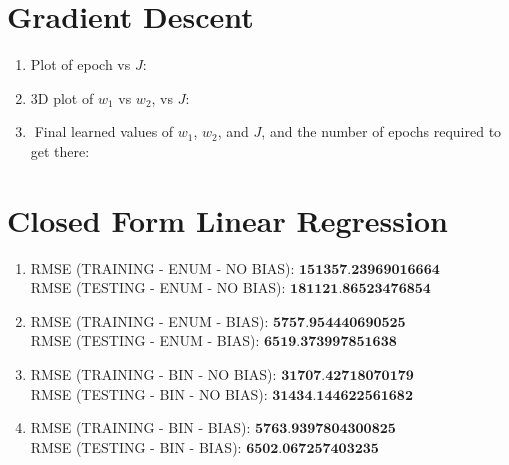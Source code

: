 \documentclass[12pt]{article}
\begin{document}
\begin{enumerate}
\begin{enumerate}
	\end{enumerate}

	
	\begin{comment}

	\end{comment}
	

\end{enumerate}

\newpage

\section{Gradient Descent}

	\begin{enumerate}
		
		\item Plot of epoch vs $J$:\\
		
		
		
		\item 3D plot of $w_1$ vs $w_2$, vs $J$:\\
		
		
		
		\item Final learned values of $w_1$, $w_2$, and $J$, and the number of epochs required to get there:\\
		
		
	\end{enumerate}
	


\section{Closed Form Linear Regression}

	\begin{enumerate}
		

		\item 
		RMSE (TRAINING - ENUM - NO BIAS):  $\textbf{151357.23969016664}$\\
		RMSE (TESTING - ENUM - NO BIAS):  $\textbf{181121.86523476854}$\\
		
		\item
		RMSE (TRAINING - ENUM - BIAS):  $\textbf{5757.954440690525}$\\
		RMSE (TESTING - ENUM - BIAS):  $\textbf{6519.373997851638}$\\
		
		\item
		RMSE (TRAINING - BIN - NO BIAS):  $\textbf{31707.42718070179}$\\
		RMSE (TESTING - BIN - NO BIAS):  $\textbf{31434.144622561682}$\\
		
		\item
		RMSE (TRAINING - BIN - BIAS):  $\textbf{5763.9397804300825}$\\
		RMSE (TESTING - BIN - BIAS):  $\textbf{6502.067257403235}$\\


	\end{enumerate}
\end{document}
